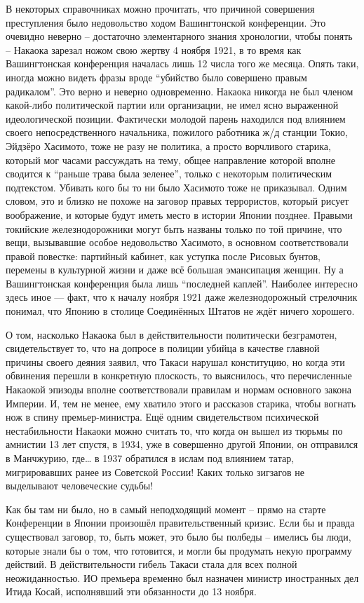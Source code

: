 В некоторых справочниках можно прочитать, что причиной совершения преступления было недовольство ходом Вашингтонской конференции. Это очевидно неверно – достаточно элементарного знания хронологии, чтобы понять – Накаока зарезал ножом свою жертву 4 ноября 1921, в то время как Вашингтонская конференция началась лишь 12 числа того же месяца. Опять таки, иногда можно видеть фразы вроде “убийство было совершено правым радикалом”. Это верно и неверно одновременно. Накаока никогда не был членом какой-либо политической партии или организации, не имел ясно выраженной идеологической позиции. Фактически молодой парень находился под влиянием своего непосредственного начальника, пожилого работника ж/д станции Токио, Эйдзёро Хасимото, тоже не разу не политика, а просто ворчливого старика, который мог часами рассуждать на тему, общее направление которой вполне сводится к “раньше трава была зеленее”, только с некоторым политическим подтекстом. Убивать кого бы то ни было Хасимото тоже не приказывал. Одним словом, это и близко не похоже на заговор правых террористов, который рисует воображение, и которые будут иметь место в истории Японии позднее. Правыми токийские железнодорожники могут быть названы только по той причине, что вещи, вызывавшие особое недовольство Хасимото, в основном соответствовали правой повестке: партийный кабинет, как уступка после Рисовых бунтов, перемены в культурной жизни и даже всё большая эмансипация женщин. Ну а Вашингтонская конференция была лишь “последней каплей”. Наиболее интересно здесь иное — факт, что к началу ноября 1921 даже железнодорожный стрелочник понимал, что Японию в столице Соединённых Штатов не ждёт ничего хорошего.

О том, насколько Накаока был в действительности политически безграмотен, свидетельствует то, что на допросе в полиции убийца в качестве главной причины своего деяния заявил, что Такаси нарушал конституцию, но когда эти обвинения перешли в конкретную плоскость, то выяснилось, что перечисленные Накаокой эпизоды вполне соответствовали правилам и нормам основного закона Империи. И, тем не менее, ему хватило этого и рассказов старика, чтобы вогнать нож в спину премьер-министра. Ещё одним свидетельством психической нестабильности Накаоки можно считать то, что когда он вышел из тюрьмы по амнистии 13 лет спустя, в 1934, уже в совершенно другой Японии, он отправился в Манчжурию, где… в 1937 обратился в ислам под влиянием татар, мигрировавших ранее из Советской России! Каких только зигзагов не выделывают человеческие судьбы!

Как бы там ни было, но в самый неподходящий момент – прямо на старте Конференции в Японии произошёл правительственный кризис. Если бы и правда существовал заговор, то, быть может, это было бы полбеды – имелись бы люди, которые знали бы о том, что готовится, и могли бы продумать некую программу действий. В действительности гибель Такаси стала для всех полной неожиданностью. ИО премьера временно был назначен министр иностранных дел Итида Косай, исполнявший эти обязанности до 13 ноября. 

